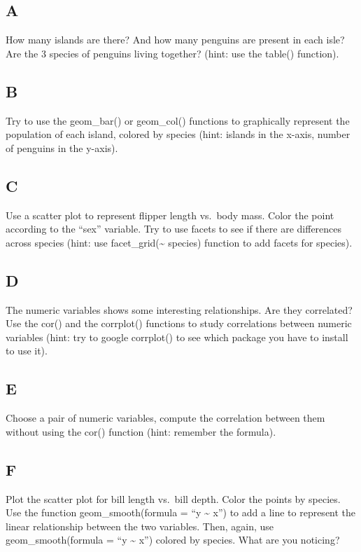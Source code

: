 \documentclass[
]{article}
\begin{document}
\hypertarget{a-4}{%
\subsection{A}\label{a-4}}

How many islands are there? And how many penguins are present in each
isle? Are the 3 species of penguins living together? (hint: use the
table() function).

\hypertarget{b-4}{%
\subsection{B}\label{b-4}}

Try to use the geom\_bar() or geom\_col() functions to graphically
represent the population of each island, colored by species (hint:
islands in the x-axis, number of penguins in the y-axis).

\hypertarget{c-4}{%
\subsection{C}\label{c-4}}

Use a scatter plot to represent flipper length vs.~body mass. Color the
point according to the ``sex'' variable. Try to use facets to see if
there are differences across species (hint: use
facet\_grid(\textasciitilde{} species) function to add facets for
species).

\hypertarget{d-3}{%
\subsection{D}\label{d-3}}

The numeric variables shows some interesting relationships. Are they
correlated? Use the cor() and the corrplot() functions to study
correlations between numeric variables (hint: try to google corrplot()
to see which package you have to install to use it).

\hypertarget{e-2}{%
\subsection{E}\label{e-2}}

Choose a pair of numeric variables, compute the correlation between them
without using the cor() function (hint: remember the formula).

\hypertarget{f}{%
\subsection{F}\label{f}}

Plot the scatter plot for bill length vs.~bill depth. Color the points
by species. Use the function geom\_smooth(formula = ``y
\textasciitilde{} x'') to add a line to represent the linear
relationship between the two variables. Then, again, use
geom\_smooth(formula = ``y \textasciitilde{} x'') colored by species.
What are you noticing?
\end{document}
